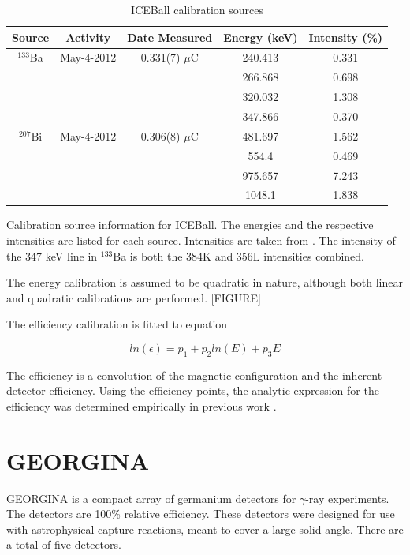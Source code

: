 \begin{table}[]
    \centering
    \caption{ICEBall calibration sources}
    \begin{tabular}{c|c|c|c|c} \toprule
         Source & Activity & Date Measured & Energy (keV) & Intensity (\%)\\
          \hline 
         $^{133}$Ba & May-4-2012 & 0.331(7) $\mu$C & 240.413 & 0.331 \\
         & & & 266.868 & 0.698 \\
         & & & 320.032 & 1.308 \\
         & & & 347.866 & 0.370 \\
         \hline
         $^{207}$Bi & May-4-2012 & 0.306(8) $\mu$C & 481.697 & 1.562 \\ 
         & & & 554.4 & 0.469 \\
         & & & 975.657 & 7.243 \\
         & & & 1048.1 & 1.838 \\\bottomrule
    \end{tabular}
    \footnotesize
    \item Calibration source information for ICEBall. The energies and the respective intensities are listed for each source. Intensities are taken from \cite{trzaska90:_calibration}. The intensity of the 347 keV line in $^{133}$Ba is both the 384K and 356L intensities combined.
    \label{tab:ICE_Cal_Source}
\end{table}

The energy calibration is assumed to be quadratic in nature, although both linear and quadratic calibrations are performed. [FIGURE]

The efficiency calibration is fitted to equation

\begin{equation}
    ln(\epsilon) = p_1+p_2ln(E)+p_3E
    \label{eq:SiLi_Eff}
\end{equation}

The efficiency is a convolution of the magnetic configuration and the inherent detector efficiency. Using the efficiency points, the analytic expression for the efficiency was determined empirically in previous work \citep{battaglia15:_iceball_176lu}.

\section{GEORGINA}

GEORGINA is a compact array of germanium detectors for $\gamma$-ray experiments. The detectors are 100\% relative efficiency. These detectors were designed for use with astrophysical capture reactions, meant to cover a large solid angle. There are a total of five detectors.

